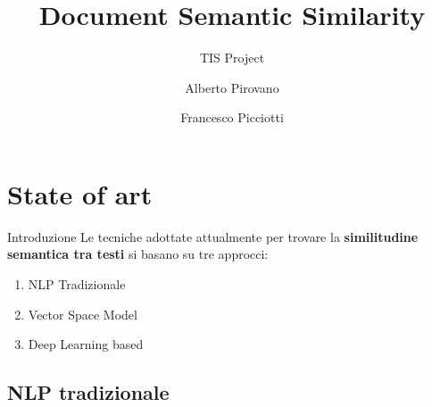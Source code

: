 \documentclass[british]{beamer}
\begin{document}
%
\title[Document Semantic Similarity]
{Document Semantic Similarity}

\subtitle{TIS Project}

\author[A. Pirovano, F. Picciotti]
{Alberto Pirovano \and Francesco Picciotti}





\maketitle

\section{State of art}

\begin{frame}{Introduzione}
	Le tecniche adottate attualmente per trovare la \textbf{similitudine semantica tra testi} si basano su tre approcci:
	\begin{enumerate}
		\item NLP Tradizionale
		\item Vector Space Model
		\item Deep Learning based 
	\end{enumerate}
\end{frame}
	
\subsection{NLP tradizionale}
	
\end{document}
